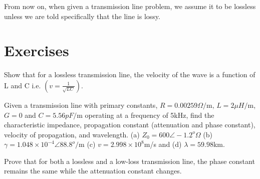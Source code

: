 From now on, when given a transmission line problem, we assume it to be lossless unless we are told specifically that the line is lossy.

\section*{Exercises}
\begin{ExerciseList}
\Exercise[label={ex41}]
Show that for a lossless transmission line, the velocity of the wave is a function of L and C i.e. $\left(v = \frac{1}{\sqrt{LC}}\right)$.

\Exercise[label={ex42}]
Given a transmission line with primary constants, $R = 0.00259\varOmega/$m, $L = 2\mu H/$m, $G = 0$ and $C = 5.56pF/$m operating at a frequency of 5kHz, find the characteristic impedance, propagation constant (attenuation and phase constant), velocity of propagation, and wavelength.
\Answer[ref={ex42}]
(a) $Z_0 = 600\angle-1.2^o\varOmega$ (b) $\gamma = 1.048\times10^{-4}\angle88.8^o/$m (c) $v = 2.998\times10^8$m/s and (d) $\lambda = 59.98$km.

\Exercise[label={ex43}]
Prove that for both a lossless and a low-loss transmission line, the phase constant remains the same while the attenuation constant changes.
\end{ExerciseList}

